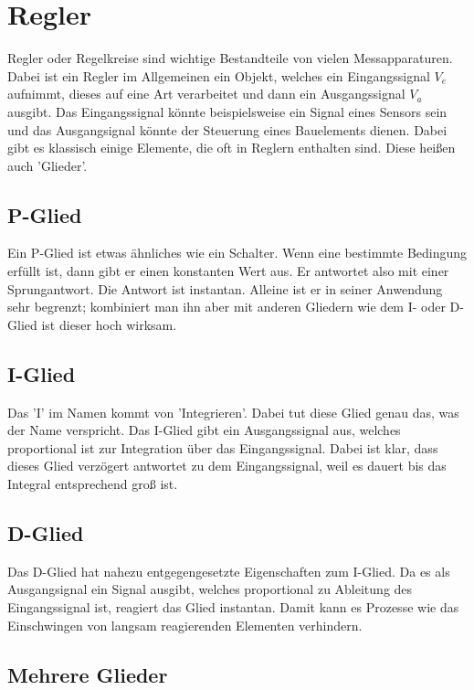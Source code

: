\section{Regler}

Regler oder Regelkreise sind wichtige Bestandteile von vielen Messapparaturen. Dabei ist ein Regler im Allgemeinen ein Objekt, welches 
ein Eingangssignal $V_e$ aufnimmt, dieses auf eine Art verarbeitet und dann ein Ausgangssignal $V_a$ ausgibt. Das Eingangssignal könnte 
beispielsweise ein Signal eines Sensors sein und das Ausgangsignal könnte der Steuerung eines Bauelements dienen. Dabei gibt es klassisch einige Elemente, die 
oft in Reglern enthalten sind. Diese heißen auch 'Glieder'.

\subsection*{P-Glied}

Ein P-Glied ist etwas ähnliches wie ein Schalter. Wenn eine bestimmte Bedingung erfüllt ist, dann gibt er einen konstanten Wert aus. Er antwortet also mit einer 
Sprungantwort. Die Antwort ist instantan. Alleine ist er in seiner Anwendung sehr begrenzt; kombiniert man ihn aber mit anderen Gliedern wie dem I- oder D-Glied ist dieser hoch wirksam.

\subsection*{I-Glied}

Das 'I' im Namen kommt von 'Integrieren'. Dabei tut diese Glied genau das, was der Name verspricht. Das I-Glied gibt ein Ausgangssignal aus, welches 
proportional ist zur Integration über das Eingangssignal. Dabei ist klar, dass dieses Glied verzögert antwortet zu dem Eingangssignal, weil 
es dauert bis das Integral entsprechend groß ist.

\subsection*{D-Glied}

Das D-Glied hat nahezu entgegengesetzte Eigenschaften zum I-Glied. Da es als Ausgangsignal ein Signal ausgibt, welches proportional zu Ableitung des 
Eingangssignal ist, reagiert das Glied instantan. Damit kann es Prozesse wie das Einschwingen von langsam reagierenden Elementen verhindern.

\subsection*{Mehrere Glieder}

